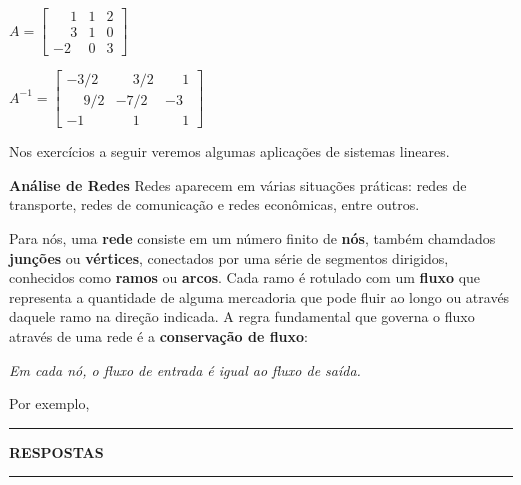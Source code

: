 \documentclass[12pt]{exam}
\begin{document}
\begin{exercicio}\label{matrizinversafim}
  $
    A =\begin{bmatrix}
        \phantom{-} 1 & 1 & 2\\
        \phantom{-} 3 & 1 & 0\\
        -2 & 0 & 3
    \end{bmatrix}
  $
  \begin{solucao}
    $
      A^{-1} =\begin{bmatrix}
        -3/2 & \phantom{-} 3/2 & \phantom{-} 1\\
        \phantom{-} 9/2 & -7/2 & -3\\
        -1 & \phantom{-} 1 & \phantom{-} 1
      \end{bmatrix}
    $
  \end{solucao}
\end{exercicio}


\vspace{2cm}

Nos exercícios a seguir veremos algumas aplicações de sistemas lineares.

\noindent\textbf{Análise de Redes}
Redes aparecem em várias situações práticas: redes de transporte, redes de comunicação e redes econômicas, entre outros.

Para nós, uma \textbf{rede} consiste em um número finito de \textbf{nós}, também chamdados \textbf{junções} ou \textbf{vértices}, conectados por uma série de segmentos
dirigidos, conhecidos como \textbf{ramos} ou \textbf{arcos}. Cada ramo é rotulado com um \textbf{fluxo} que representa a quantidade de alguma mercadoria que pode fluir ao longo ou através daquele ramo na direção indicada. A regra fundamental que governa o fluxo através de uma rede é a \textbf{conservação de fluxo}:
\begin{center}
  \textit{Em cada nó, o fluxo de entrada é igual ao fluxo de saída.}
\end{center}
Por exemplo,


\newpage
{}
\hrule
\begin{center}
{\large\bf RESPOSTAS}
\end{center}
\hrule

\end{document}
